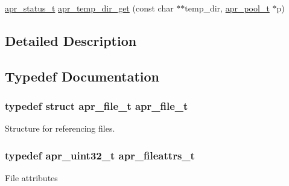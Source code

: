 \begin{DoxyCompactItemize}
\item 
\hyperlink{group__apr__errno_gaf76ee4543247e9fb3f3546203e590a6c}{apr\+\_\+status\+\_\+t} \hyperlink{group__apr__file__io_ga5cc19828a668c362be0ad7a12b805cc0}{apr\+\_\+temp\+\_\+dir\+\_\+get} (const char $\ast$$\ast$temp\+\_\+dir, \hyperlink{group__apr__pools_gaf137f28edcf9a086cd6bc36c20d7cdfb}{apr\+\_\+pool\+\_\+t} $\ast$p)
\end{DoxyCompactItemize}


\subsection{Detailed Description}


\subsection{Typedef Documentation}
\subsubsection[{\texorpdfstring{apr\+\_\+file\+\_\+t}{apr_file_t}}]{\setlength{\rightskip}{0pt plus 5cm}typedef struct {\bf apr\+\_\+file\+\_\+t} {\bf apr\+\_\+file\+\_\+t}}\hypertarget{group__apr__file__io_gaa46e4763ac375ea3c7a43ba6f6099e22}{}\label{group__apr__file__io_gaa46e4763ac375ea3c7a43ba6f6099e22}
Structure for referencing files. 
\subsubsection[{\texorpdfstring{apr\+\_\+fileattrs\+\_\+t}{apr_fileattrs_t}}]{\setlength{\rightskip}{0pt plus 5cm}typedef apr\+\_\+uint32\+\_\+t {\bf apr\+\_\+fileattrs\+\_\+t}}\hypertarget{group__apr__file__io_ga11fbee5a7a3f3d45fff5c31df0db9737}{}\label{group__apr__file__io_ga11fbee5a7a3f3d45fff5c31df0db9737}
File attributes 

